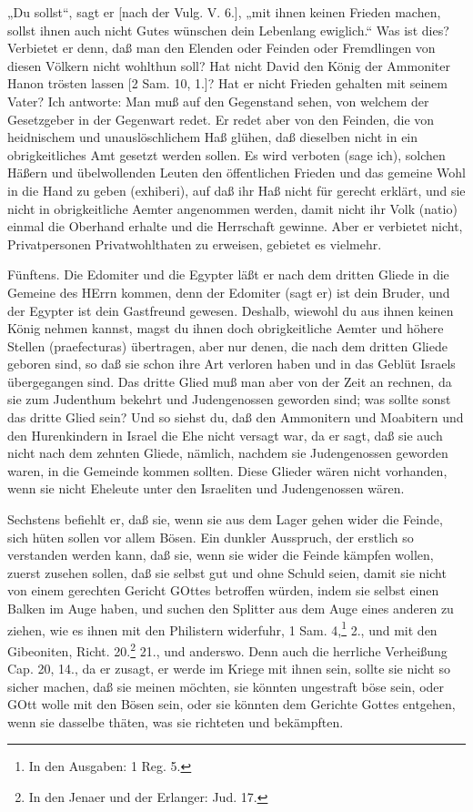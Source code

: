 „Du sollst“, sagt er [nach der Vulg. V. 6.], „mit ihnen keinen Frieden machen, sollst ihnen auch nicht Gutes wünschen dein Lebenlang ewiglich.“ Was ist dies? Verbietet er denn, daß man den Elenden oder Feinden oder Fremdlingen von diesen Völkern nicht wohlthun soll? Hat nicht David den König der Ammoniter Hanon trösten lassen [2 Sam. 10, 1.]? Hat er nicht Frieden gehalten mit seinem Vater? Ich antworte: Man muß auf den Gegenstand sehen, von welchem der Gesetzgeber in der Gegenwart redet. Er redet aber von den Feinden, die von heidnischem und unauslöschlichem Haß glühen, daß dieselben nicht in ein obrigkeitliches Amt gesetzt werden sollen. Es wird verboten (sage ich), solchen Häßern und übelwollenden Leuten den öffentlichen Frieden und das gemeine Wohl in
die Hand zu geben (exhiberi), auf daß ihr Haß nicht für gerecht erklärt, und sie nicht in obrigkeitliche Aemter angenommen werden, damit nicht ihr Volk (natio) einmal die Oberhand erhalte und die Herrschaft gewinne. Aber er verbietet nicht, Privatpersonen Privatwohlthaten zu erweisen, gebietet es vielmehr.

Fünftens. Die Edomiter und die Egypter läßt er nach dem dritten Gliede in die Gemeine des HErrn kommen, denn der Edomiter (sagt er) ist dein Bruder, und der Egypter ist dein Gastfreund gewesen. Deshalb, wiewohl du aus ihnen keinen König nehmen kannst, magst du ihnen doch obrigkeitliche Aemter und höhere Stellen (praefecturas) übertragen, aber nur denen, die nach dem dritten Gliede geboren sind, so daß sie schon ihre Art verloren haben und in das Geblüt Israels übergegangen sind. Das dritte Glied muß man aber von der Zeit an rechnen, da sie zum Judenthum bekehrt und Judengenossen geworden sind; was sollte sonst das dritte Glied sein? Und so siehst du, daß den Ammonitern und Moabitern und den Hurenkindern in Israel die Ehe nicht versagt war, da er sagt, daß sie auch nicht nach dem zehnten Gliede, nämlich, nachdem sie Judengenossen geworden waren, in die Gemeinde kommen sollten. Diese Glieder wären nicht vorhanden, wenn sie nicht Eheleute unter den Israeliten und Judengenossen wären.

Sechstens befiehlt er, daß sie, wenn sie aus dem Lager gehen wider die Feinde, sich hüten sollen vor allem Bösen. Ein dunkler Ausspruch, der erstlich so verstanden werden kann, daß sie, wenn sie wider die Feinde kämpfen wollen, zuerst zusehen sollen, daß sie selbst gut und ohne Schuld seien, damit sie nicht von einem gerechten Gericht GOttes betroffen würden, indem sie selbst einen Balken im Auge haben, und suchen den Splitter aus dem Auge eines anderen zu ziehen, wie es ihnen mit den Philistern widerfuhr, 1 Sam. 4,\footnote{In den Ausgaben: 1 Reg. 5.} 2., und mit den Gibeoniten, Richt. 20.\footnote{In den Jenaer und der Erlanger: Jud. 17.} 21., und anderswo. Denn auch die herrliche Verheißung Cap. 20, 14., da er zusagt, er werde im Kriege mit ihnen sein, sollte sie nicht so sicher machen, daß sie meinen möchten, sie könnten ungestraft böse sein, oder GOtt wolle mit den Bösen sein, oder sie könnten dem Gerichte Gottes entgehen, wenn sie dasselbe thäten, was sie richteten und bekämpften.

